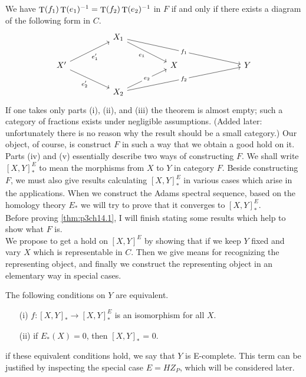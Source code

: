 \documentclass[../main]{subfiles}
\begin{document}
We have $\mathop{\mathrm{T}}(f_1)\mathop{\mathrm{T}}(e_1)^{-1} =\mathop{\mathrm{T}}(f_2)\mathop{\mathrm{T}}(e_2)^{-1}$ in $F$ if and only if there exists a diagram of the following form in $C$. 
\[\begin{tikzcd}
	&& {X_1} \\
	{X'} &&&& X &&& Y \\
	&& {X_2}
	\arrow["{e'_1}"', from=2-1, to=1-3]
	\arrow["{e'_2}"', from=2-1, to=3-3]
	\arrow["{e_1}"', from=1-3, to=2-5]
	\arrow["{e_2}"{description}, from=3-3, to=2-5]
	\arrow["{f_1}"{description}, from=1-3, to=2-8]
	\arrow["{f_2}"{description}, from=3-3, to=2-8]
\end{tikzcd}\]
If one takes only parts (i), (ii), and (iii) the theorem is almost empty; such a category of fractions exists under negligible assumptions. (Added later: unfortunately there is no reason why the result should be a small category.) Our object, of course, is construct $F$ in such a way that we obtain a good hold on it. Parts (iv) and (v) essentially describe two ways of constructing $F$. We shall write  $\left[ X,Y \right] _{\ast}^E$ to mean the morphisms from $X$ to $Y$ in category $F$. Beside constructing  $F$, we must also give results calculating  $\left[ X,Y \right] _{\ast}^E$ in various cases which arise in the applications. When we construct the Adams spectral sequence, based on the homology theory $E_{\ast}$ we will try to prove that it converges to  $\left[ X,Y \right] _{\ast}^E$.\\
Before proving \ref{thm:p3ch14.1}, I will finish stating some results which help to show what $F$ is. \\
We propose to get a hold on $\left[ X,Y \right]^E$ by showing that if we keep $Y$ fixed and vary $X$ which is representable in  $C$. Then we give means for recognizing the representing object, and finally we construct the representing object in an elementary way in special cases.
\begin{proposition} \label{prop:p3ch14.2}
The following conditions on $Y$ are equivalent. 
 \begin{enumerate}
   \item [(i)] $f\colon \left[ X,Y \right] _{\ast} \to \left[ X,Y \right]^E_{\ast} $ is an isomorphism for all $X$. 
   \item [(ii)] if $E_{\ast}(X)=0$, then $\left[ X,Y \right] _{\ast}$ = 0. 
\end{enumerate} 
if these equivalent conditions hold, we say that $Y$ is E-complete. This term can be justified by inspecting the special case $E=HZ _{P}$, which will be considered later. 
\end{proposition}
\end{document}
